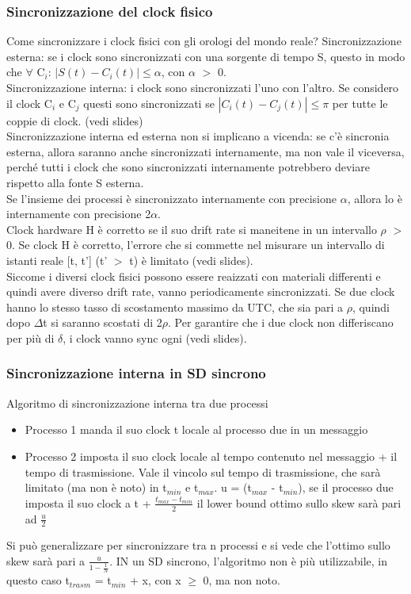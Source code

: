 \documentclass[16px]{article}
\begin{document}
\subsubsection{Sincronizzazione del clock fisico}
Come sincronizzare i clock fisici con gli orologi del mondo reale? Sincronizzazione esterna: se i clock sono sincronizzati con una sorgente di tempo S, questo in modo che $\forall$ C$_i$: $|S(t) - C_i(t)| \leq \alpha$, con $\alpha$ $>$ 0.\\ Sincronizzazione interna: i clock sono sincronizzati l'uno con l'altro. Se considero il clock C$_i$ e C$_j$ questi sono sincronizzati se $|C_i(t) - C_j(t)| \leq \pi$ per tutte le coppie di clock. (vedi slides)\\ Sincronizzazione interna ed esterna non si implicano a vicenda: se c'è sincronia esterna, allora saranno anche sincronizzati internamente, ma non vale il viceversa, perché tutti i clock che sono sincronizzati internamente potrebbero deviare rispetto alla fonte S esterna.\\ Se l'insieme dei processi è sincronizzato internamente con precisione $\alpha$, allora lo è internamente con precisione 2$\alpha$.\\ Clock hardware H è corretto se il suo drift rate si maneitene in un intervallo $\rho$ $>$ 0. Se clock H è corretto, l'errore che si commette nel misurare un intervallo di istanti reale [t, t'] (t' $>$ t) è limitato (vedi slides).\\ Siccome i diversi clock fisici possono essere reaizzati con materiali differenti e quindi avere diverso drift rate, vanno periodicamente sincronizzati. Se due clock hanno lo stesso tasso di scostamento massimo da UTC, che sia pari a $\rho$, quindi dopo $\Delta$t si saranno scostati di 2$\rho$. Per garantire che i due clock non differiscano per più di $\delta$, i clock vanno sync ogni (vedi slides).
\subsubsection{Sincronizzazione interna in SD sincrono}
Algoritmo di sincronizzazione interna tra due processi
\begin{itemize}
\item Processo 1 manda il suo clock t locale al processo due in un messaggio
\item Processo 2 imposta il suo clock locale al tempo contenuto nel messaggio + il tempo di trasmissione. Vale il vincolo sul tempo di trasmissione, che sarà limitato (ma non è noto) in t$_{min}$ e t$_{max}$. u = (t$_{max}$ - t$_{min}$), se il processo due imposta il suo clock a t + $\frac{t_{max} - t_{min}}{2}$ il lower bound ottimo sullo skew sarà pari ad $\frac{u}{2}$
\end{itemize}
Si può generalizzare per sincronizzare tra n processi e si vede che l'ottimo sullo skew sarà pari a $\frac{u}{1 - \frac{1}{N}}$. IN un SD sincrono, l'algoritmo non è più utilizzabile, in questo caso t$_{trasm}$ = t$_{min}$ + x, con x $\geq$ 0, ma non noto.
\end{document}
